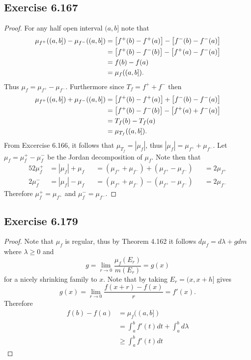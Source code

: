 \documentclass[hw_all.tex]{subfiles}
\begin{document}
\subsection{Exercise 6.167}
\begin{proof}
    For any half open interval $(a,b]$ note that
    \begin{align*}
        \mu_{f^+}((a,b]) - \mu_{f^-}((a,b]) &= \qty[f^+(b) - f^+(a)] - \qty[f^-(b) - f^-(a)] \\
                                            &= \qty[f^+(b) - f^-(b)] - \qty[f^+(a) - f^-(a)] \\
                                            &= f(b) - f(a) \\
                                            &= \mu_f((a,b]).
    \end{align*}
    Thus $\mu_f = \mu_{f^+} - \mu_{f^-}$. Furthermore since $T_f = f^+ + f^-$ then
    \begin{align*}
        \mu_{f^+}((a,b]) + \mu_{f^-}((a,b]) &= \qty[f^+(b) - f^+(a)] + \qty[f^-(b) - f^-(a)] \\
                                            &= \qty[f^+(b) - f^-(b)] - \qty[f^+(a) + f^-(a)] \\
                                            &= T_f(b) - T_f(a) \\
                                            &= \mu_{T_f}((a,b]).
    \end{align*}
    From Excercise 6.166, it follows that $\mu_{T_f} = |\mu_f|$, thus $|\mu_f| = \mu_{f^+} + \mu_{f^-}$. Let $\mu_f = \mu_f^+ - \mu_f^-$ be the Jordan decomposition of $\mu_f$. Note then that
    \begin{alignat*}{5}
        2 \mu_f^+ &= |\mu_f| + \mu_f &&= (\mu_{f^+} + \mu_{f^-}) + (\mu_{f^+} - \mu_{f^-}) &&= 2\mu_{f^+} \\
        2 \mu_f^- &= |\mu_f| - \mu_f &&= (\mu_{f^+} + \mu_{f^-}) - (\mu_{f^+} - \mu_{f^-}) &&= 2\mu_{f^-}
    \end{alignat*}
    Therefore $\mu_f^+ = \mu_{f^+}$ and $\mu_f^- = \mu_{f^-}$.
\end{proof}

\subsection{Exercise 6.179}

\begin{proof}
    Note that $\mu_f$ is regular, thus by Theorem 4.162 it follows $d\mu_f = d \lambda + g dm$ where $\lambda \geq 0$ and
    \[
        g = \lim_{r \to 0} \frac{\mu_f(E_r)}{m(E_r)} = g(x)
    \]
    for a nicely shrinking family to $x$. Note that by taking $E_r = (x, x+h]$ gives
    \[
        g(x) = \lim_{r \to 0} \frac{f(x+r) - f(x)}{r} = f'(x)
    .\]
    Therefore
    \begin{align*}
        f(b) - f(a) &= \mu_f((a,b]) \\
        &= \int_a^b f'(t) dt + \int_a^b d \lambda \\
        &\geq \int_a^b f'(t) dt
    \end{align*}
\end{proof}
\end{document}
